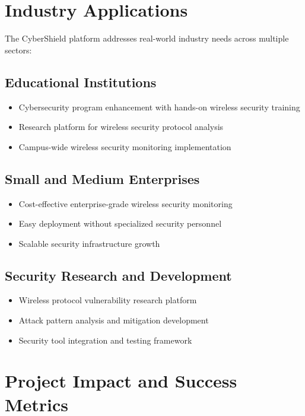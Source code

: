 \documentclass[12pt,a4paper]{report}
\begin{document}
\section{Industry Applications}

The CyberShield platform addresses real-world industry needs across multiple sectors:

\subsection{Educational Institutions}

\begin{itemize}
    \item Cybersecurity program enhancement with hands-on wireless security training
    \item Research platform for wireless security protocol analysis
    \item Campus-wide wireless security monitoring implementation
\end{itemize}

\subsection{Small and Medium Enterprises}

\begin{itemize}
    \item Cost-effective enterprise-grade wireless security monitoring
    \item Easy deployment without specialized security personnel
    \item Scalable security infrastructure growth
\end{itemize}

\subsection{Security Research and Development}

\begin{itemize}
    \item Wireless protocol vulnerability research platform
    \item Attack pattern analysis and mitigation development
    \item Security tool integration and testing framework
\end{itemize}

\section{Project Impact and Success Metrics}
\end{document}
